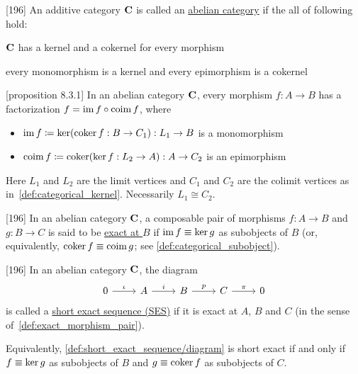 \begin{definition}\label{def:abelian_category}\cite{MacLane1994}[196]
  An additive category $\operatorname{\mathbf{C}}$ is called an \uline{abelian category} if the all of following hold:
  \begin{defenum}
    \item $\operatorname{\mathbf{C}}$ has a kernel and a cokernel for every morphism
    \item every monomorphism is a kernel and every epimorphism is a cokernel
  \end{defenum}
\end{definition}

\begin{proposition}\label{def:abelian_category_morphism_factorization}\cite{MacLane1994}[proposition 8.3.1]
  In an abelian category $\operatorname{\mathbf{C}}$, every morphism $f: A \to B$ has a factorization $f = \operatorname{im} f \circ \operatorname{coim} f$, where
  \begin{itemize}
    \item $\operatorname{im} f \coloneqq \operatorname{ker}(\operatorname{coker} f: B \to C_1): L_1 \to B$ is a monomorphism
    \item $\operatorname{coim} f \coloneqq \operatorname{coker}(\operatorname{ker} f: L_2 \to A): A \to C_2$ is an epimorphism
  \end{itemize}
  Here $L_1$ and $L_2$ are the limit vertices and $C_1$ and $C_2$ are the colimit vertices as in~\cref{def:categorical_kernel}. Necessarily $L_1 \cong C_2$.
\end{proposition}

\begin{definition}\label{def:exact_morphism_pair}\cite{MacLane1994}[196]
  In an abelian category $\operatorname{\mathbf{C}}$, a composable pair of morphisms $f: A \to B$ and $g: B \to C$ is said to be \uline{exact at $B$} if $\operatorname{im} f \equiv \operatorname{ker} g$ as subobjects of $B$ (or, equivalently, $\operatorname{coker} f \equiv \operatorname{coim} g$; see \cref{def:categorical_subobject}).
\end{definition}

\begin{definition}\label{def:short_exact_sequence}\cite{MacLane1994}[196]
  In an abelian category $\operatorname{\mathbf{C}}$, the diagram
  \begin{equation}\label{def:short_exact_sequence/diagram}
    \begin{tikzcd}[baseline=(current bounding box.center)]
      0 \arrow[r, "\iota"] & A \arrow[r, "i"] & B \arrow[r, "p"] & C \arrow[r, "\pi"] & 0
    \end{tikzcd}
  \end{equation}
  is called a \uline{short exact sequence (SES)} if it is exact at $A$, $B$ and $C$ (in the sense of~\cref{def:exact_morphism_pair}).

  Equivalently, \cref{def:short_exact_sequence/diagram} is short exact if and only if $f \equiv \operatorname{ker} g$ as subobjects of $B$ and $g \equiv \operatorname{coker} f$ as subobjects of $C$.
\end{definition}

